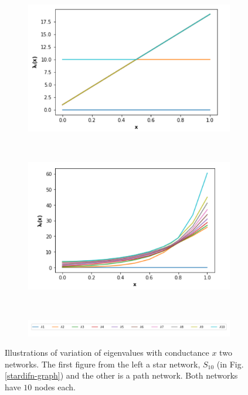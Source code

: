 \documentclass[10pt,a4paper]{article}
\begin{document}
\begin{figure}[!h]
	\centering
	\begin{subfigure}[b]{0.45\textwidth}
		\includegraphics[width= \textwidth]{images/Star-network-eigenplot.png}
		\label{star-spectra}
	\end{subfigure}~
	\begin{subfigure}[b]{0.45\textwidth}
		\includegraphics[width= \textwidth]{images/Path-network-eigenplot.png}
		\label{path-spectra}
	\end{subfigure} \\
	\begin{subfigure}[b]{0.85\textwidth}
		\includegraphics[width= \textwidth]{images/legend-eigenvalues.png}
	\end{subfigure}
	\caption{Illustrations of variation of eigenvalues with conductance $x$ two networks. The first figure from the left a star network, $S_{10}$ (in Fig. \ref{stardifn-graph}) and the other is a path network. Both networks have $10$ nodes each.}
	\label{eigen-xvalues}
\end{figure}
\end{document}
